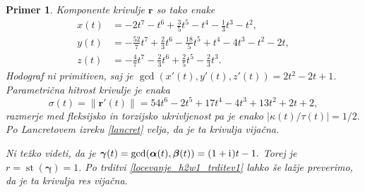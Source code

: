 \documentclass[12pt,a4paper,twoside]{article}
\newcommand{\iu}{\mathrm{i}\mkern1mu} %
\theoremstyle{definition} %
\theoremstyle{plain} %
\theoremstyle{primerstyle}
\newtheorem{primer}[definicija]{Primer}
\numberwithin{equation}{section}  %
\newcommand{\rV}{\mathbf{r}}
\newcommand{\balpha}{\boldsymbol \alpha}
\newcommand{\bbeta}{\boldsymbol \beta}
\newcommand{\bgamma}{\boldsymbol \gamma}
\DeclareMathOperator{\st}{st}
\begin{document}
\begin{primer}
	Komponente krivulje $\rV$ so tako enake
	\begin{align*}
		x(t)&=-2t^7-t^6+\frac{3}{5}t^5-t^4-\frac{1}{3}t^3-t^2,\\
		y(t)&=-\frac{52}{7}t^7+\frac{2}{3}t^6-\frac{18}{5}t^5+t^4-4t^3-t^2-2t,\\
		z(t)&=-\frac{4}{7}t^7-\frac{2}{3}t^6+\frac{2}{5}t^5-\frac{2}{3}t^3.
	\end{align*}
	Hodograf ni primitiven, saj je $\gcd(x'(t),y'(t),z'(t))=2t^2-2t+1.$ Parametrična hitrost krivulje je enaka
	\begin{equation*}
		\sigma(t)=\lVert\rV'(t)\rVert=54t^6-2t^5+17t^4-4t^3+13t^2+2t+2,
	\end{equation*}
	razmerje med fleksijsko in torzijsko ukrivljenost pa je enako $|\kappa(t)/\tau(t)|=1/2.$ Po Lancretovem izreku \ref{lancret} velja, da je ta krivulja vijačna.
	
	Ni težko videti, da je $\bgamma(t)=\gcd(\balpha(t),\bbeta(t))=(1+\iu)t-1.$ Torej je $r=\st(\bgamma)=1.$ Po trditvi \ref{locevanje_h2w1_trditev1} lahko še lažje preverimo, da je ta krivulja res vijačna.
\end{primer}
\end{document}
